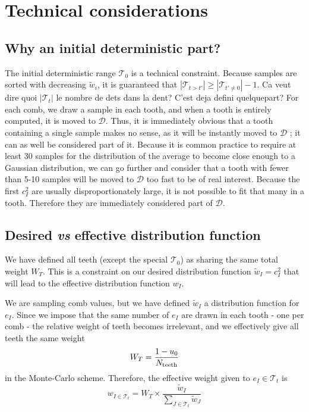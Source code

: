 \documentclass[./thesis.tex]{subfiles}
\begin{document}
\section{Technical considerations}


\subsection{Why an initial deterministic part?}

The initial deterministic range $\mathcal{T}_0$ is a technical constraint.
Because samples are sorted with decreasing $\tilde w_i$, it is guaranteed that $|\mathcal{T}_{t>t'}| \geq |\mathcal{T}_{t' \neq 0}|-1$. \alert{ Ca veut dire quoi $|\mathcal{T}_t|$ le nombre de dets dans la dent? C'est deja defini quelquepart? }
For each comb, we draw a sample in each tooth, and when a tooth is entirely computed, it is moved to $\mathcal{D}$. Thus, it is immediately obvious that a tooth containing a single sample makes no sense, as it will be instantly moved to $\mathcal{D}$ ; it can as well be considered part of it. Because it is common practice to require at least 30 samples for the distribution of the average to become close enough to a Gaussian distribution, we can go further and consider that a tooth with fewer than 5-10 samples will be moved to $\mathcal{D}$ too fast to be of real interest. Because the first $c_I^2$ are usually disproportionately large, it is not possible to fit that many in a tooth. Therefore they are immediately considered part of $\mathcal{D}$.

\subsection{Desired \textit{vs} effective distribution function}

We have defined all teeth (except the special $\mathcal{T}_0$) as sharing the same total weight $W_T$. This is a constraint on our desired distribution function $\tilde w_I = c_I^2$ that will lead to the effective distribution function $w_I$.

We are sampling comb values, but we have defined $\tilde w_I$ a distribution function for $e_I$. Since we impose that the same number of $e_I$ are drawn in each tooth - one per comb - the relative weight of teeth becomes irrelevant, and we effectively give all teeth the same weight 
\begin{equation}
W_T=\frac{1-u_0}{N_\text{teeth}}
\end{equation}
in the Monte-Carlo scheme. Therefore, the effective weight given to $e_I \in \mathcal{T}_t$ is
\begin{equation}
w_{I \in \mathcal{T}_t} = W_T \times \frac{\tilde w_I}{\sum_{J \in \mathcal{T}_t} \tilde w_J}
\end{equation}
\end{document}
